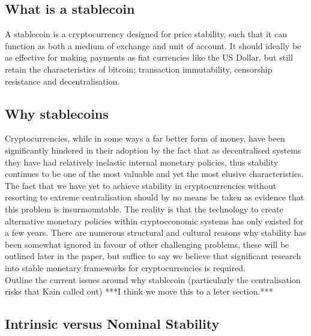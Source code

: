 \subsection{What is a stablecoin}

\noindent A stablecoin is a cryptocurrency designed for price stability, such that it can function as both a medium of exchange and unit of account. It should ideally be as effective for making payments as fiat currencies like the US Dollar, but still retain the characteristics of bitcoin; transaction immutability, censorship resistance and decentralisation. \\

\subsection{Why stablecoins}

\noindent Cryptocurrencies, while in some ways a far better form of money, have been significantly hindered in their adoption by the fact that as decentralised systems they have had relatively inelastic internal monetary policies, thus stability continues to be one of the most valuable and yet the most elusive characteristics. The fact that we have yet to achieve stability in cryptocurrencies without resorting to extreme centralisation should by no means be taken as evidence that this problem is insurmountable. The reality is that the technology to create alternative monetary policies within cryptoeconomic systems has only existed for a few years. There are numerous structural and cultural reasons why stability has been somewhat ignored in favour of other challenging problems, these will be outlined later in the paper, but suffice to say we believe that significant research into stable monetary frameworks for cryptocurrencies is required. \\

\noindent Outline the current issues around why stablecoin (particularly the centralisation risks that Kain called out) ***I think we move this to a leter section.*** \\

\subsection{Intrinsic versus Nominal Stability}

